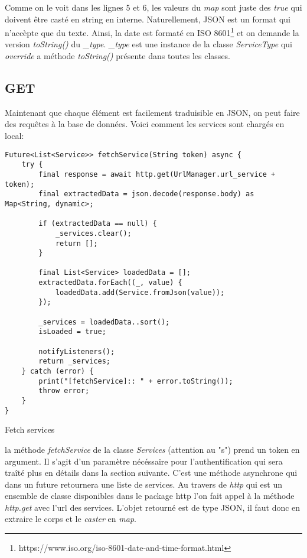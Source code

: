 Comme on le voit dans les lignes 5 et 6, les valeurs du \textit{map} sont juste des \textit{true} qui doivent être casté en string en interne.
Naturellement, JSON est un format qui n'accèpte que du texte. Ainsi, la date est formaté en ISO 8601\footnote{https://www.iso.org/iso-8601-date-and-time-format.html} et on demande la version \textit{toString()} du \textit{\_type}. \textit{\_type} est une instance de la classe \textit{ServiceType} qui \textit{override} a méthode \textit{toString()} présente dans toutes les classes.
\newpage
\subsection*{GET}
Maintenant que chaque élément est facilement traduisible en JSON, on peut faire des requêtes à la base de données. Voici comment les services sont chargés en local:

\begin{listing}[!h]
\begin{verbatim}
Future<List<Service>> fetchService(String token) async {
    try {
        final response = await http.get(UrlManager.url_service + token);
        final extractedData = json.decode(response.body) as Map<String, dynamic>;

        if (extractedData == null) {
            _services.clear();
            return [];
        }

        final List<Service> loadedData = [];
        extractedData.forEach((_, value) {
            loadedData.add(Service.fromJson(value));
        });

        _services = loadedData..sort();
        isLoaded = true;

        notifyListeners();
        return _services;
    } catch (error) {
        print("[fetchService]:: " + error.toString());
        throw error;
    }
}    
\end{verbatim}
\caption{Fetch services}
\label{code:fetchService}
\end{listing}

la méthode \textit{fetchService} de la classe \textit{Services} (attention au "s") prend un token en argument. Il s'agit d'un paramètre nécéssaire pour l'authentification qui sera traîté plus en détails dans la section suivante. C'est une méthode asynchrone qui dans un future retournera une liste de services. Au travers de \textit{http} qui est un ensemble de classe disponibles dans le package http l'on fait appel à la méthode \textit{http.get} avec l'url des services. L'objet retourné est de type JSON, il faut donc en extraire le corps et le \textit{caster} en \textit{map}.

